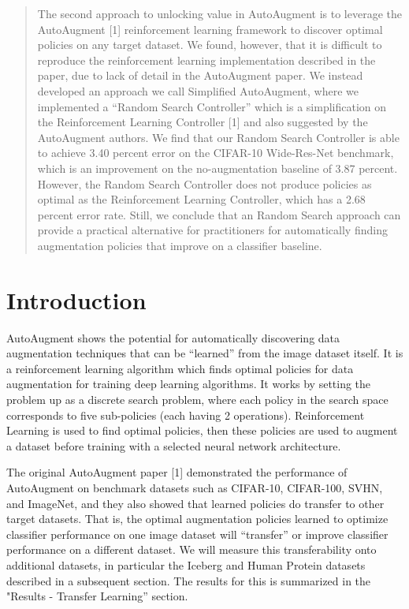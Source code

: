 \documentclass[10pt,twocolumn,letterpaper]{article}
\begin{document}
\begin{abstract}
The second approach to unlocking value in AutoAugment is to leverage the AutoAugment [1] reinforcement learning framework to discover optimal policies on any target dataset.  We found, however, that it is difficult to reproduce the reinforcement learning implementation described in the paper, due to lack of detail in the AutoAugment paper.  We instead developed an approach we call Simplified AutoAugment, where we implemented a “Random Search Controller” which is a simplification on the Reinforcement Learning Controller [1] and also suggested by the AutoAugment authors.  We find that our Random Search Controller is able to achieve 3.40 percent error on the CIFAR-10 Wide-Res-Net benchmark, which is an improvement on the no-augmentation baseline of 3.87 percent.  However, the Random Search Controller does not produce policies as optimal as the Reinforcement Learning Controller, which has a 2.68 percent error rate.  Still, we conclude that an Random Search approach can provide a practical alternative for practitioners for automatically finding augmentation policies that improve on a classifier baseline.

\end{abstract}

\section{Introduction}

AutoAugment shows the potential for automatically discovering data augmentation techniques that can be “learned” from the image dataset itself. It is a reinforcement learning algorithm which finds optimal policies for data augmentation for training deep learning algorithms. It works by setting the problem up as a discrete search problem, where each policy in the search space corresponds to five sub-policies (each having 2 operations). Reinforcement Learning is used to find optimal policies, then these policies are used to augment a dataset before training with a selected neural network architecture.

The original AutoAugment paper [1] demonstrated the performance of AutoAugment on benchmark datasets such as CIFAR-10, CIFAR-100, SVHN, and ImageNet, and they also showed that learned policies do transfer to other target datasets.  That is, the optimal augmentation policies learned to optimize classifier performance on one image dataset will “transfer” or improve classifier performance on a different dataset.   We will measure this transferability onto additional datasets, in particular the Iceberg and Human Protein datasets described in a subsequent section.  The results for this is summarized in the "Results - Transfer Learning” section.
\end{document}
